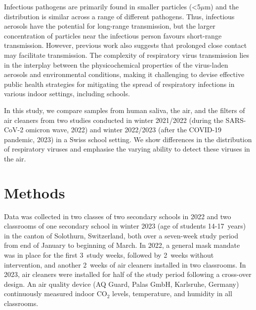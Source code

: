 \documentclass[fleqn,11pt]{wlscirep}
\begin{document}
Infectious pathogens are primarily found in smaller particles (<5$\mu$m) and the distribution is similar across a range of different pathogens\cite{Fennelly2020}. Thus, infectious aerosols have the potential for long-range transmission, but the larger concentration of particles near the infectious person favours short-range transmission\cite{Tellier2009JTRSI,Wang2020,Morawska2020}. However, previous work also suggests that prolonged close contact may facilitate transmission\cite{Leung2020NatMed,Brankston2007LancetID,Lind2023NatCommun}. The complexity of respiratory virus transmission lies in the interplay between the physicochemical properties of the virus-laden aerosols and environmental conditions\cite{Wang2020,Morawska2020}, making it challenging to devise effective public health strategies for mitigating the spread of respiratory infections in various indoor settings, including schools.

In this study, we compare samples from human saliva, the air, and the filters of air cleaners from two studies conducted in winter 2021/2022 (during the SARS-CoV-2 omicron wave, 2022)\cite{Banholzer2023PLoSMed} and winter 2022/2023 (after the COVID-19 pandemic, 2023)\cite{Banholzer2023submitted} in a Swiss school setting. We show differences in the distribution of respiratory viruses and emphasise the varying ability to detect these viruses in the air. 


\section*{Methods}

Data was collected in two classes of two secondary schools in 2022 and two classrooms of one secondary school in winter 2023 (age of students 14-17~years) in the canton of Solothurn, Switzerland, both over a seven-week study period from end of January to beginning of March. In 2022, a general mask mandate was in place for the first 3~study weeks, followed by 2~weeks without intervention, and another 2~weeks of air cleaners installed in two classrooms. In 2023, air cleaners were installed for half of the study period following a cross-over design. An air quality device (AQ Guard, Palas GmbH, Karlsruhe, Germany) continuously measured indoor CO$_2$ levels, temperature, and humidity in all classrooms. 
\end{document}
